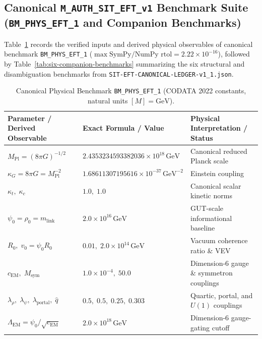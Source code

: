 \begin{longtable}{|p{2.3cm}|p{4.3cm}|p{8.4cm}|}
\hline
\end{longtable}

\subsection{Canonical \texttt{M\_AUTH\_SIT\_EFT\_v1} Benchmark Suite (\texttt{BM\_PHYS\_EFT\_1} and Companion Benchmarks)}

Table~\ref{tab:bm-phys-eft-1} records the verified inputs and derived physical observables of canonical benchmark \texttt{BM\_PHYS\_EFT\_1} ($\max\text{SymPy/NumPy rtol} = 2.22\times 10^{-16}$), followed by Table~\ref{tab:six-companion-benchmarks} summarizing the six structural and disambiguation benchmarks from \texttt{SIT-EFT-CANONICAL-LEDGER-v1\_\allowbreak{}1.\allowbreak{}json}.

\begin{table}[htbp]
\centering
\caption{Canonical Physical Benchmark \texttt{BM\_PHYS\_EFT\_1} (CODATA 2022 constants, natural units $[M] = \mathrm{GeV}$).}
\label{tab:bm-phys-eft-1}
\vspace{0.4em}
\footnotesize
\begin{tabular}{|>{\raggedright\arraybackslash}p{5.5cm}|>{\raggedright\arraybackslash}p{4.3cm}|>{\raggedright\arraybackslash}p{5.0cm}|}
\hline
\textbf{Parameter / Derived Observable} & \textbf{Exact Formula / Value} & \textbf{Physical Interpretation / Status} \\
\hline
$M_{\mathrm{Pl}} = (8\pi G)^{-1/2}$ & $2.4353234593382036 \times 10^{18}\,\mathrm{GeV}$ & Canonical reduced Planck scale \\
$\kappa_G = 8\pi G = M_{\mathrm{Pl}}^{-2}$ & $1.68611307195616 \times 10^{-37}\,\mathrm{GeV}^{-2}$ & Einstein coupling \\
$\kappa_t,\;\kappa_c$ & $1.0,\;1.0$ & Canonical scalar kinetic norms \\
$\psi_0 = \rho_0 = m_{\mathrm{link}}$ & $2.0 \times 10^{16}\,\mathrm{GeV}$ & GUT-scale informational baseline \\
$R_0,\;v_0 = \psi_0 R_0$ & $0.01,\;2.0 \times 10^{14}\,\mathrm{GeV}$ & Vacuum coherence ratio \& VEV \\
$c_{\mathrm{EM}},\;M_{\mathrm{sym}}$ & $1.0 \times 10^{-4},\;50.0$ & Dimension-6 gauge \& symmetron couplings \\
$\lambda_\rho,\;\lambda_\psi,\;\lambda_{\mathrm{portal}},\;\hat{q}$ & $0.5,\;0.5,\;0.25,\;0.303$ & Quartic, portal, and $U(1)$ couplings \\
\hline
$\Lambda_{\mathrm{EM}} = \psi_0 / \sqrt{c_{\mathrm{EM}}}$ & $2.0 \times 10^{18}\,\mathrm{GeV}$ & Dimension-6 gauge-gating cutoff \\

\end{tabular}
\end{table}

